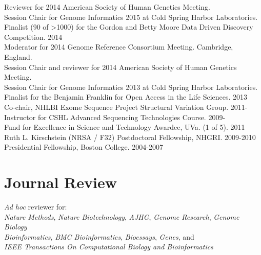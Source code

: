 \documentclass[margin,line]{cv}
\begin{document}
\begin{resume}
    Reviewer for 2014 American Society of Human Genetics Meeting. \\\vspace{1mm}%
    Session Chair for Genome Informatics 2015 at Cold Spring Harbor Laboratories. \\\vspace{1mm}%
    Finalist (90 of \textgreater 1000) for the Gordon and Betty Moore Data Driven Discovery Competition. 2014 \\\vspace{1mm}%
    Moderator for 2014 Genome Reference Consortium Meeting. Cambridge, England. \\\vspace{1mm}%
    Session Chair and reviewer for 2014 American Society of Human Genetics Meeting. \\\vspace{1mm}%
    Session Chair for Genome Informatics 2013 at Cold Spring Harbor Laboratories. \\\vspace{1mm}%
	  Finalist for the Benjamin Franklin for Open Access in the Life Sciences. 2013 \\\vspace{1mm}%
    Co-chair, NHLBI Exome Sequence Project Structural Variation Group. 2011-                           \\\vspace{1mm}%
    Instructor for CSHL Advanced Sequencing Technologies Course. 2009-                                 \\\vspace{1mm}%
    Fund for Excellence in Science and Technology Awardee, UVa. (1 of 5). 2011                         \\\vspace{1mm}%
    Ruth L. Kirschstein (NRSA / F32) Postdoctoral Fellowship, NHGRI. 2009-2010                         \\\vspace{1mm}%
    Presidential Fellowship, Boston College. 2004-2007                                                               %



    \section{\mysidestyle Journal Review}
    \textit{Ad hoc} reviewer for:\\
        \textit{Nature Methods}, \textit{Nature Biotechnology}, \textit{AJHG}, \textit{Genome Research}, \textit{Genome Biology}\\
	      \textit{Bioinformatics}, \textit{BMC Bioinformatics}, \textit{Bioessays}, \textit{Genes}, and \\
        \textit{IEEE Transactions On Computational Biology and Bioinformatics}


\end{resume}
\end{document}
